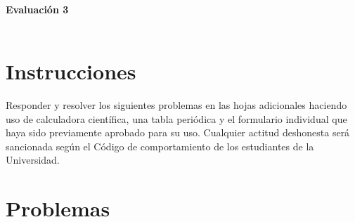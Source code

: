 \documentclass[a4paper,12pt]{article}
\begin{document}

\begin{center}
\HRule \\[0.4cm]
{ \bfseries Evaluaci\'on 3}\\ %
\HRule \\[0.4cm]
\end{center}


\section*{Instrucciones}

Responder y resolver los siguientes problemas en las hojas adicionales haciendo uso de calculadora cient\'ifica, una tabla peri\'odica y el formulario individual que haya sido previamente aprobado para su uso. Cualquier actitud deshonesta ser\'a sancionada seg\'un el C\'odigo de comportamiento de los estudiantes de la Universidad.

\section*{Problemas}
\end{document}
